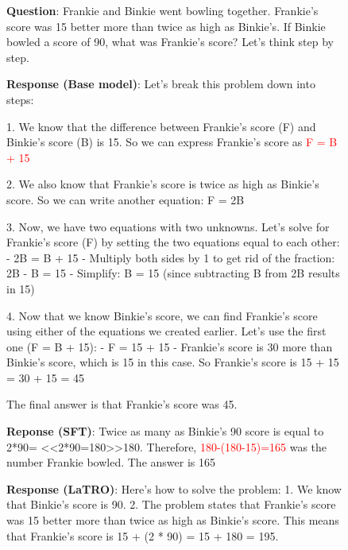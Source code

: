 \begin{figure}[ht]
    \centering
    \begin{bluetextbox}
        \textbf{Question}: Frankie and Binkie went bowling together. Frankie's score was 15 better more than twice as high as Binkie's. If Binkie bowled a score of 90, what was Frankie's score? Let's think step by step.

        \textbf{Response (Base model)}: Let's break this problem down into steps:
        
        1. We know that the difference between Frankie's score (F) and Binkie's score (B) is 15. So we can express Frankie's score as \textcolor{red}{F = B + 15}
        
        2. We also know that Frankie's score is twice as high as Binkie's score. So we can write another equation: F = 2B
        
        3. Now, we have two equations with two unknowns. Let's solve for Frankie's score (F) by setting the two equations equal to each other:
        - 2B = B + 15
        - Multiply both sides by 1 to get rid of the fraction: 2B - B = 15
        - Simplify: B = 15 (since subtracting B from 2B results in 15)
        
        4. Now that we know Binkie's score, we can find Frankie's score using either of the equations we created earlier. Let's use the first one (F = B + 15):
        - F = 15 + 15
        - Frankie's score is 30 more than Binkie's score, which is 15 in this case. So Frankie's score is 15 + 15 = 30 + 15 = 45
        
        The final answer is that Frankie's score was 45.

        \textbf{Reponse (SFT)}: Twice as many as Binkie's 90 score is equal to 2*90= <<2*90=180>>180. Therefore, \textcolor{red}{180-(180-15)=165} was the number Frankie bowled. The answer is 165

        \textbf{Response (LaTRO)}: Here's how to solve the problem:
        1. We know that Binkie's score is 90.
        2. The problem states that Frankie's score was 15 better more than twice as high as Binkie's score. This means that Frankie's score is 15 + (2 * 90) = 15 + 180 = 195.

    \end{bluetextbox}
    

\end{figure}
